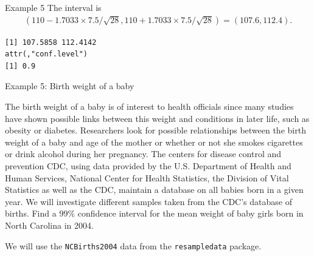 \documentclass[
  ignorenonframetext,
]{beamer}
\newenvironment{Shaded}{\begin{snugshade}}{\end{snugshade}}
\newcommand{\AttributeTok}[1]{\textcolor[rgb]{0.13,0.29,0.53}{#1}}
\newcommand{\CommentTok}[1]{\textcolor[rgb]{0.56,0.35,0.01}{\textit{#1}}}
\newcommand{\DecValTok}[1]{\textcolor[rgb]{0.00,0.00,0.81}{#1}}
\newcommand{\FloatTok}[1]{\textcolor[rgb]{0.00,0.00,0.81}{#1}}
\newcommand{\FunctionTok}[1]{\textcolor[rgb]{0.13,0.29,0.53}{\textbf{#1}}}
\newcommand{\NormalTok}[1]{#1}
\newcommand{\SpecialCharTok}[1]{\textcolor[rgb]{0.81,0.36,0.00}{\textbf{#1}}}
\begin{document}
\begin{frame}[fragile]{Example 5}
\label{example-5-1}
The interval is \[\begin{array}{ll}
(110-1.7033\times 7.5/\sqrt{28},110+1.7033\times 7.5/\sqrt{28})=(107.6, 112.4).
\end{array}\]

\normalsize

\begin{Shaded}
\end{Shaded}

\begin{verbatim}
[1] 107.5858 112.4142
attr(,"conf.level")
[1] 0.9
\end{verbatim}

\normalsize
\end{frame}

\begin{frame}[fragile]{Example 5: Birth weight of a baby}
\label{example-5-birth-weight-of-a-baby}
\begin{tcolorbox}
The birth weight of a baby is of interest to health officials since many studies have shown possible links between this weight and conditions in later life, such as obesity or diabetes. Researchers look for possible relationships between the birth weight of a baby and age of the mother or whether or not she smokes cigarettes or drink alcohol during her pregnancy. The centers for disease control and prevention CDC, using data provided by the U.S. Department of Health and Human Services, National Center for Health Statistics, the Division of Vital Statistics as well as the CDC, maintain a database on all babies born in a given year. We will investigate different samples taken from the CDC’s database of births. Find a $99\%$ confidence interval for the mean weight of baby girls born in North Carolina in 2004.
\end{tcolorbox}

We will use the \texttt{NCBirths2004} data from the
\texttt{resampledata} package.
\end{frame}
\end{document}
